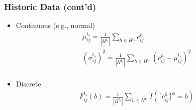 \documentclass[t]{beamer}
\begin{document}
\begin{frame}\frametitle{Historic Data \small{(cont'd)}}
\begin{itemize}
\item Continuous (e.g., normal)
\begin{gather*}
	\mu_{ij}^{t_s} = \frac{1}{|H^{t_s}|}\sum_{h\in H^{t_s}} c_{ij}^h\\ 
	(\sigma_{ij}^{t_s})^2 = \frac{1}{|H^{t_s}|}\sum_{h\in H^{t_s}} (c_{ij}^h-\mu_{ij}^{t_s})^2\\
\end{gather*}
\item Discrete
\begin{gather*}
  F_{ij}^{t_s}(b) = \frac{1}{|H^{t_s}|}\sum_{h\in H^{t_s}} I(\lceil c_{ij}^h \rceil^\phi= b)
\end{gather*}
\end{itemize}
\end{frame}
\end{document}
